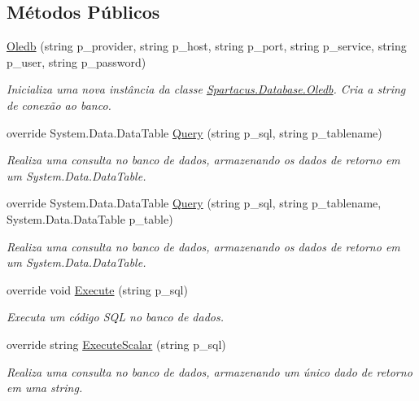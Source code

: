 \subsection*{Métodos Públicos}
\begin{DoxyCompactItemize}
\item 
\hyperlink{classSpartacus_1_1Database_1_1Oledb_a151e92500d1aa88e96169201d3138b0a}{Oledb} (string p\+\_\+provider, string p\+\_\+host, string p\+\_\+port, string p\+\_\+service, string p\+\_\+user, string p\+\_\+password)
\begin{DoxyCompactList}\small\item\em Inicializa uma nova instância da classe \hyperlink{classSpartacus_1_1Database_1_1Oledb}{Spartacus.\+Database.\+Oledb}. Cria a string de conexão ao banco. \end{DoxyCompactList}\item 
override System.\+Data.\+Data\+Table \hyperlink{classSpartacus_1_1Database_1_1Oledb_a6f914652553778f6e0a683ac92ab1f87}{Query} (string p\+\_\+sql, string p\+\_\+tablename)
\begin{DoxyCompactList}\small\item\em Realiza uma consulta no banco de dados, armazenando os dados de retorno em um System.\+Data.\+Data\+Table. \end{DoxyCompactList}\item 
override System.\+Data.\+Data\+Table \hyperlink{classSpartacus_1_1Database_1_1Oledb_ab5f3ae20ac53dcc95182c0845a04d460}{Query} (string p\+\_\+sql, string p\+\_\+tablename, System.\+Data.\+Data\+Table p\+\_\+table)
\begin{DoxyCompactList}\small\item\em Realiza uma consulta no banco de dados, armazenando os dados de retorno em um System.\+Data.\+Data\+Table. \end{DoxyCompactList}\item 
override void \hyperlink{classSpartacus_1_1Database_1_1Oledb_acfe60cb51ca949f93a1197c3cdf88231}{Execute} (string p\+\_\+sql)
\begin{DoxyCompactList}\small\item\em Executa um código S\+Q\+L no banco de dados. \end{DoxyCompactList}\item 
override string \hyperlink{classSpartacus_1_1Database_1_1Oledb_a7131081aa9dcb742321104b3a2c0c1f5}{Execute\+Scalar} (string p\+\_\+sql)
\begin{DoxyCompactList}\small\item\em Realiza uma consulta no banco de dados, armazenando um único dado de retorno em uma string. \end{DoxyCompactList}\end{DoxyCompactItemize}
